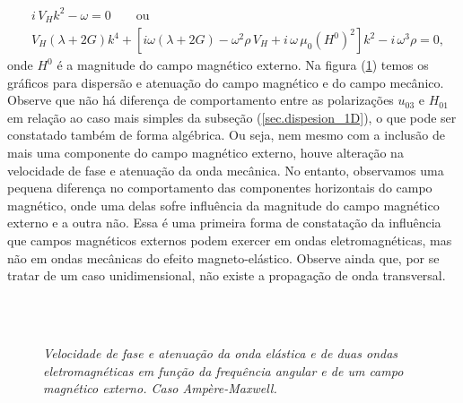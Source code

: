 \begin{align}
&i\,V_Hk^2-\omega=0\qquad\text{ou}\\\label{eq.disp_amp_max}
&V_H(\lambda+2G)k^4+\left[i\omega(\lambda+2G)-\omega^2\rho\,V_H+i\,\omega\,\mu_0(H^0)^2\right]k^2-i\,\omega^3\rho=0,
\end{align}
onde $H^0$ \'e a magnitude do campo magn\'etico externo. Na figura (\ref{fig.disp_am_ma}) temos os gr\'aficos para dispers\~ao e atenua\c{c}\~ao do campo magn\'etico e do campo mec\^anico. Observe que n\~ao h\'a diferen\c{c}a de comportamento entre as polariza\c{c}\~oes  $u_{03}$ e $H_{01}$ em rela\c{c}\~ao ao caso mais simples da subse\c{c}\~ao (\ref{sec.dispesion_1D}), o que pode ser constatado tamb\'em de forma alg\'ebrica. Ou seja, nem mesmo com a inclus\~ao de mais uma componente do campo magn\'etico externo, houve altera\c{c}\~ao na velocidade de fase e atenua\c{c}\~ao da onda mec\^anica. No entanto, observamos uma pequena diferen\c{c}a no comportamento das componentes horizontais do campo magn\'etico, onde uma delas sofre influ\^encia da magnitude do campo magn\'etico externo e a outra n\~ao. Essa \'e uma primeira forma de constata\c{c}\~ao da influ\^encia que campos magn\'eticos externos podem exercer em ondas eletromagn\'eticas, mas n\~ao em ondas mec\^anicas do efeito magneto-el\'astico. Observe ainda que, por se tratar de um caso unidimensional, n\~ao existe a propaga\c{c}\~ao de onda transversal.

\begin{figure}
\centering
{}
\\
\\
\caption{\textit{Velocidade de fase e atenua\c{c}\~ao da onda el\'astica e de duas ondas eletromagn\'eticas em fun\c{c}\~ao da frequ\^encia angular e de um campo magn\'etico externo. Caso Amp\`ere-Maxwell.}}
\label{fig.disp_am_ma}
\end{figure}


